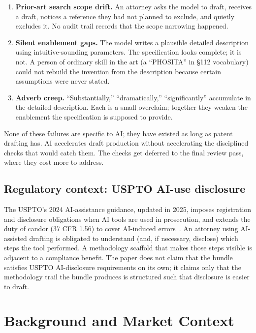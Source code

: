 \documentclass[11pt,letterpaper]{article}
\begin{document}
\begin{enumerate}[leftmargin=*,itemsep=0.3em]
\item \textbf{Prior-art search scope drift.} An attorney asks the
  model to draft, receives a draft, notices a reference they had not
  planned to exclude, and quietly excludes it. No audit trail records
  that the scope narrowing happened.
\item \textbf{Silent enablement gaps.} The model writes a plausible
  detailed description using intuitive-sounding parameters. The
  specification looks complete; it is not. A person of ordinary skill
  in the art (a ``PHOSITA'' in \S112 vocabulary) could not rebuild
  the invention from the description because certain assumptions were
  never stated.
\item \textbf{Adverb creep.} ``Substantially,'' ``dramatically,''
  ``significantly'' accumulate in the detailed description. Each is
  a small overclaim; together they weaken the enablement the
  specification is supposed to provide.
\end{enumerate}

None of these failures are specific to AI; they have existed as long
as patent drafting has. AI accelerates draft production without
accelerating the disciplined checks that would catch them. The
checks get deferred to the final review pass, where they cost more to
address.

\subsection{Regulatory context: USPTO AI-use disclosure}

The USPTO's 2024 AI-assistance guidance, updated in 2025, imposes
registration and disclosure obligations when AI tools are used in
prosecution, and extends the duty of candor (37 CFR 1.56) to cover
AI-induced errors~\citep{uspto2024ai}. An attorney using AI-assisted
drafting is obligated to understand (and, if necessary, disclose)
which steps the tool performed. A methodology scaffold that makes
those steps visible is adjacent to a compliance benefit. The paper
does not claim that the bundle satisfies USPTO AI-disclosure
requirements on its own; it claims only that the methodology trail
the bundle produces is structured such that disclosure is easier to
draft.

\section{Background and Market Context}
\end{document}
